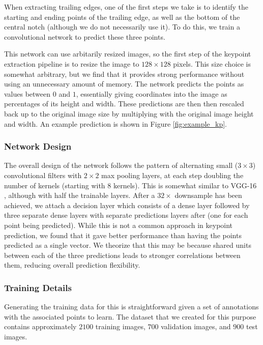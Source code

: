 When extracting trailing edges, one of the first steps we take is to identify the starting and ending points of the trailing edge, as well as the bottom of the central notch (although we do not necessarily use it).
To do this, we train a convolutional network to predict these three points.

This network can use arbitarily resized images, so the first step of the keypoint extraction pipeline is to resize the image to $128 \times 128$ pixels.
This size choice is somewhat arbitrary, but we find that it provides strong performance without using an unnecessary amount of memory.
The network predicts the points as values between $0$ and $1$, essentially giving coordinates into the image as percentages of its height and width. 
These predictions are then then rescaled back up to the original image size by multiplying with the original image height and width.
An example prediction is shown in Figure \ref{fig:example_kp}.

\subsubsection{Network Design}

The overall design of the network follows the pattern of alternating small ($3 \times 3$) convolutional filters with $2 \times 2$ max pooling layers, at each step doubling the number of kernels (starting with $8$ kernels).
This is somewhat similar to VGG-16 \cite{simonyan2014very}, although with half the trainable layers.
After a $32\times$ downsample has been achieved, we attach a decision layer which consists of a dense layer followed by three separate dense layers with separate predictions layers after (one for each point being predicted).
While this is not a common approach in keypoint prediction, we found that it gave better performance than having the points predicted as a single vector.
We theorize that this may be because shared units between each of the three predictions leads to stronger correlations between them, reducing overall prediction flexibility.

\subsubsection{Training Details}

Generating the training data for this is straightforward given a set of annotations with the associated points to learn.
The dataset that we created for this purpose contains approximately $2100$ training images, $700$ validation images, and $900$ test images.

